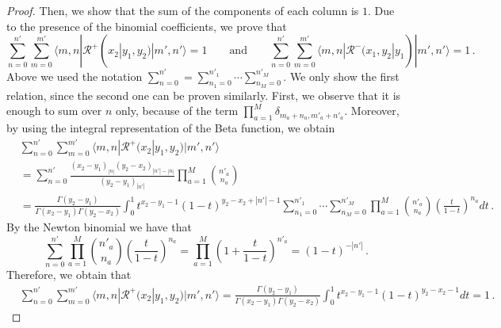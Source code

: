 \documentclass[11pt]{article}
\numberwithin{equation}{section}
\newcommand{\M}{M}
\newcommand{\eR}{\mathcal{R}}
\begin{document}
\begin{proof}
    Then, we show that the sum of the components of each column is $1$. Due to the presence of the binomial coefficients, we prove that
        \begin{equation}\label{stoch-RpRm}
    \sum_{n=0}^{n'}\sum_{m=0}^{m'}\langle m,n|  {\eR}^+(x_2|y_1,y_2) |m',n'\rangle=1 \qquad\text{and}\qquad \sum_{n=0}^{n'}\sum_{m=0}^{m'}\langle m,n|  {\eR}^-(x_1,y_2|y_1) |m',n'\rangle=1\,.
\end{equation} 
Above we used the notation $\sum_{n=0}^{n'}=\sum_{n_{1}=0}^{n'_{1}}\cdots \sum_{n_{\M}=0}^{n'_{\M}}$. We only show the first relation, since the second one can be proven similarly. First, we observe that it is enough to sum over $n$ only, because of the term $\prod_{a=1}^{\M}\delta_{m_{a}+n_{a},m'_{a}+n'_{a}}$. Moreover, by using the integral representation of the Beta function, we obtain 
\begin{equation}
\begin{split}
                     & \sum_{n=0}^{n'}\sum_{m=0}^{m'}\langle m,n| \eR^{+}(x_2| y_1, y_2) |m',n'\rangle\\
        &=\sum_{n=0}^{n'} \frac{(x_2-y_1)_{|n|} (y_2-x_2)_{|n'|-|n|}}{(y_2-y_1)_{|n'|} }\prod_{a=1}^{\M}\binom{n'_a}{n_a}
        \\&=
         \frac{\Gamma(y_{2}-y_{1})}{\Gamma(x_{2}-y_{1})\Gamma(y_{2}-x_{2})}\int_{0}^{1}t^{x_{2}-y_{1}-1}(1-t)^{y_{2}-x_{2}+|n'|-1}
         \sum_{n_{1}=0}^{n'_{1}}\cdots \sum_{n_{\M}=0}^{n'_{\M}}\prod_{a=1}^{\M}\binom{n'_{a}}{n_{a}}\left(\frac{t}{1-t}\right)^{n_{a}}dt\,.
        \end{split}
    \end{equation}
     By the Newton binomial we have that  
    \begin{equation}
         \sum_{n=0}^{n'}\prod_{a=1}^{\M}\binom{n'_{a}}{n_{a}}\left(\frac{t}{1-t}\right)^{n_{a}}=\prod_{a=1}^{\M}\left(1+\frac{t}{1-t}\right)^{n'_{a}}=(1-t)^{-|n'|}\,.
    \end{equation}    
    Therefore, we obtain that
    \begin{equation}
        \begin{split}
            &\sum_{n=0}^{n'}\sum_{m=0}^{m'}\langle m,n| \eR^{+}(x_2| y_1, y_2) |m',n'\rangle=
            \frac{\Gamma(y_{2}-y_{1})}{\Gamma(x_{2}-y_{1})\Gamma(y_{2}-x_{2})}\int_{0}^{1}t^{x_{2}-y_{1}-1}(1-t)^{y_{2}-x_{2}-1}dt=1\,.
                                 \end{split}
    \end{equation}
                                  	\end{proof}
\end{document}
